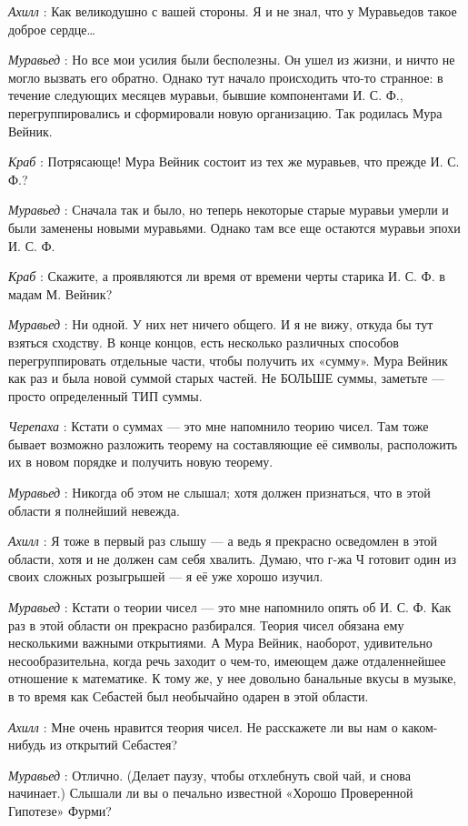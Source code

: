 \documentclass[../main.tex]{subfiles}
\begin{document}
\begin{dialogue}
\emph{Ахилл} : Как великодушно с вашей стороны. Я и не знал, что у Муравьедов такое доброе сердце\ldots{}

\emph{Муравьед} : Но все мои усилия были бесполезны. Он ушел из жизни, и ничто не могло вызвать его обратно. Однако тут начало происходить что-то странное: в течение следующих месяцев муравьи, бывшие компонентами И. С. Ф., перегруппировались и сформировали новую организацию. Так родилась Мура Вейник.

\emph{Краб} : Потрясающе! Мура Вейник состоит из тех же муравьев, что прежде И. С. Ф.?

\emph{Муравьед} : Сначала так и было, но теперь некоторые старые муравьи умерли и были заменены новыми муравьями. Однако там все еще остаются муравьи эпохи И. С. Ф.

\emph{Краб} : Скажите, а проявляются ли время от времени черты старика И. С. Ф. в мадам М. Вейник?

\emph{Муравьед} : Ни одной. У них нет ничего общего. И я не вижу, откуда бы тут взяться сходству. В конце концов, есть несколько различных способов перегруппировать отдельные части, чтобы получить их «сумму». Мура Вейник как раз и была новой суммой старых частей. Не БОЛЬШЕ суммы, заметьте --- просто определенный ТИП суммы.

\emph{Черепаха} : Кстати о суммах --- это мне напомнило теорию чисел. Там тоже бывает возможно разложить теорему на составляющие её символы, расположить их в новом порядке и получить новую теорему.

\emph{Муравьед} : Никогда об этом не слышал; хотя должен признаться, что в этой области я полнейший невежда.

\emph{Ахилл} : Я тоже в первый раз слышу --- а ведь я прекрасно осведомлен в этой области, хотя и не должен сам себя хвалить. Думаю, что г-жа Ч готовит один из своих сложных розыгрышей --- я её уже хорошо изучил.

\emph{Муравьед} : Кстати о теории чисел --- это мне напомнило опять об И. С. Ф. Как раз в этой области он прекрасно разбирался. Теория чисел обязана ему несколькими важными открытиями. А Мура Вейник, наоборот, удивительно несообразительна, когда речь заходит о чем-то, имеющем даже отдаленнейшее отношение к математике. К тому же, у нее довольно банальные вкусы в музыке, в то время как Себастей был необычайно одарен в этой области.

\emph{Ахилл} : Мне очень нравится теория чисел. Не расскажете ли вы нам о каком-нибудь из открытий Себастея?

\emph{Муравьед} : Отлично. (Делает паузу, чтобы отхлебнуть свой чай, и снова начинает.) Слышали ли вы о печально известной «Хорошо Проверенной Гипотезе» Фурми?


\end{dialogue}
\end{document}
